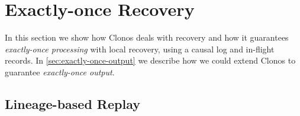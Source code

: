 \documentclass[sigconf]{acmart}
\newcounter{AsteriosNOC}
\newcommand{\asterios}[1]{\noindent\textcolor{purple}{\small \bf [Asterios\#\arabic{AsteriosNOC}\stepcounter{AsteriosNOC}: #1]}}
\begin{document}
\section{Exactly-once Recovery}
\label{sec:correctness}

In this section we show how Clonos deals with recovery and how it guarantees \textit{exactly-once processing} with local recovery, using a causal log and in-flight records. In \autoref{sec:exactly-once-output} we describe how we could extend Clonos to guarantee \textit{exactly-once output}.
















\subsection{Lineage-based Replay}
\label{sub:lineage}
\end{document}
